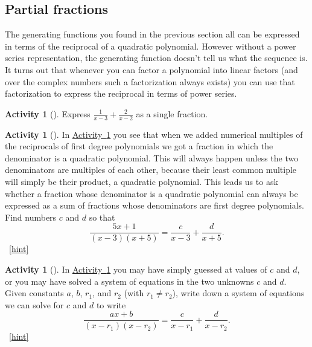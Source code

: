 \documentclass[10pt,]{book}
\theoremstyle{plain}
\theoremstyle{definition}
\theoremstyle{definition}
\theoremstyle{definition}
\newtheorem{activity}[project]{Activity}
\numberwithin{equation}{chapter}
\begin{document}
\subsection[{Partial fractions}]{Partial fractions}\label{subsection-38}
\hypertarget{p-1356}{}%
The generating functions you found in the previous section all can be expressed in terms of the reciprocal of a quadratic polynomial. However without a power series representation, the generating function doesn't tell us what the sequence is. It turns out that whenever you can factor a polynomial into linear factors (and over the complex numbers such a factorization always exists) you can use that factorization to express the reciprocal in terms of power series.%
\begin{activity}[]\label{simplifysumoffractions}
\hypertarget{p-1357}{}%
Express \(\frac{1}{x-3} + \frac{2}{x-2}\) as a single fraction.%
\end{activity}
\begin{activity}[]\label{partialfractionsintro}
\hypertarget{p-1359}{}%
In \hyperref[simplifysumoffractions]{Activity~\ref{simplifysumoffractions}} you see that when we added numerical multiples of the reciprocals of first degree polynomials we got a fraction in which the denominator is a quadratic polynomial. This will always happen unless the two denominators are multiples of each other, because their least common multiple will simply be their product, a quadratic polynomial. This leads us to ask whether a fraction whose denominator is a quadratic polynomial can always be expressed as a sum of fractions whose denominators are first degree polynomials. Find numbers \(c\) and \(d\) so that%
\begin{equation*}
\frac{5x+1}{(x-3)(x+5)} = \frac{c}{x-3} + \frac{d}{x+5}.
\end{equation*}
%
~\hfill{\tiny\hyperlink{a-264}{[hint]}\hypertarget{q-264}{}}\end{activity}
\begin{activity}[]\label{partialfractions1}
\hypertarget{p-1362}{}%
In \hyperref[partialfractionsintro]{Activity~\ref{partialfractionsintro}} you may have simply guessed at values of \(c\) and \(d\), or you may have solved a system of equations in the two unknowns \(c\) and \(d\). Given constants \(a\), \(b\), \(r_1\), and \(r_2\) (with \(r_1\not= r_2\)), write down a system of equations we can solve for \(c\) and \(d\) to write%
\begin{equation*}
\frac{ax+b}{(x-r_1)(x-r_2)} = \frac{c}{x-r_1} + \frac{d}{x-r_2}\text{.}
\end{equation*}
%
~\hfill{\tiny\hyperlink{a-265}{[hint]}\hypertarget{q-265}{}}\end{activity}
\end{document}
